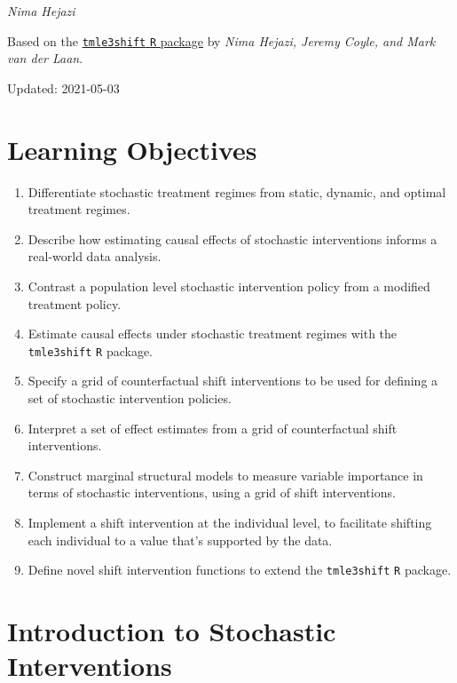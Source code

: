 \documentclass[12pt, krantz2,]{krantz}
\newcommand{\passthrough}[1]{#1}
\providecommand{\tightlist}{%
  \setlength{\itemsep}{0pt}\setlength{\parskip}{0pt}}
\theoremstyle{definition}
\theoremstyle{definition}
\theoremstyle{definition}
\newcommand{\1}{\mathbbm{1}}
\begin{document}
\emph{Nima Hejazi}

Based on the \href{https://github.com/tlverse/tmle3shift}{\passthrough{\lstinline!tmle3shift!} \passthrough{\lstinline!R!} package}
by \emph{Nima Hejazi, Jeremy Coyle, and Mark van der Laan}.

Updated: 2021-05-03

\hypertarget{learning-objectives-4}{%
\section{Learning Objectives}\label{learning-objectives-4}}

\begin{enumerate}
\def\labelenumi{\arabic{enumi}.}
\tightlist
\item
  Differentiate stochastic treatment regimes from static, dynamic, and optimal
  treatment regimes.
\item
  Describe how estimating causal effects of stochastic interventions informs a
  real-world data analysis.
\item
  Contrast a population level stochastic intervention policy from a modified
  treatment policy.
\item
  Estimate causal effects under stochastic treatment regimes with the
  \passthrough{\lstinline!tmle3shift!} \passthrough{\lstinline!R!} package.
\item
  Specify a grid of counterfactual shift interventions to be used for defining
  a set of stochastic intervention policies.
\item
  Interpret a set of effect estimates from a grid of counterfactual shift
  interventions.
\item
  Construct marginal structural models to measure variable importance in terms
  of stochastic interventions, using a grid of shift interventions.
\item
  Implement a shift intervention at the individual level, to facilitate
  shifting each individual to a value that's supported by the data.
\item
  Define novel shift intervention functions to extend the \passthrough{\lstinline!tmle3shift!} \passthrough{\lstinline!R!}
  package.
\end{enumerate}

\hypertarget{introduction-to-stochastic-interventions}{%
\section{Introduction to Stochastic Interventions}\label{introduction-to-stochastic-interventions}}
\end{document}
